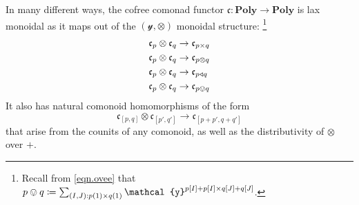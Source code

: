 \documentclass[11pt, one side, article]{memoir}
\theoremstyle{definition}
\theoremstyle{plain}
\newcommand{\Cat}[1]{\mathbf{#1}}%
\newcommand{\Fun}[1]{\mathsf{#1}}%
\newcommand{\List}{\Fun{list}}
\newcommand{\yon}{{\mathcal{y}}}
\newcommand{\poly}{\Cat{Poly}}
\newcommand{\0}{\textsf{0}}
\newcommand{\1}{\tn{\textsf{1}}}
\newcommand{\tri}{\mathbin{\triangleleft}}
\newcommand{\cofree}{\mathfrak{c}}
\newcommand{\uu}{\List}
\begin{document}
In many different ways, the cofree comonad functor $\cofree\colon\poly\to\poly$ is lax monoidal as it maps out of the $(\yon,\otimes)$ monoidal structure:%
\footnote{Recall from \eqref{eqn.ovee} that $p\ovee q\coloneqq \sum_{(I,J): p(1)\times q(1)}\yon^{p[I]+p[I]\times q[J]+q[J]}$.}
\begin{align}
  \cofree_p\otimes\cofree_q&\to\cofree_{p\times q}\\
  \label{cofree_lax_monoidal}
  \cofree_p\otimes\cofree_q&\to\cofree_{p\otimes q}\\
  \cofree_p\otimes\cofree_q&\to\cofree_{p\tri q}\\
	\cofree_p\otimes\cofree_q&\to\cofree_{p\ovee q}  
\end{align}
It also has natural comonoid homomorphisms of the form
\begin{equation}
	\cofree_{[p,q]}\otimes\cofree_{[p',q']}\to\cofree_{[p+p',q+q']}
\end{equation}
that arise from the counits of any comonoid, as well as the distributivity of $\otimes$ over $+$.

\end{document}
